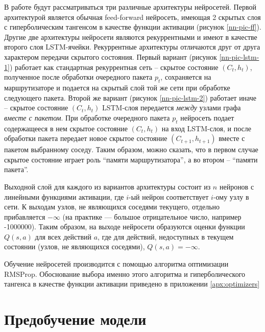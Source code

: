 \documentclass[specification, annotation]{itmo-student-thesis}
\begin{document}
В работе будут рассматриваться три различные архитектуры нейросетей. Первой
архитектурой является обычная feed-forward нейросеть, имеющая 2 скрытых слоя с
гиперболическим тангенсом в качестве функции активации (рисунок
\ref{nn-pic-ff}). Другие две архитектуры нейросети
являются рекуррентными и имеют в качестве второго слоя
LSTM-ячейки\cite{hochreiter1997long}. Рекуррентные
архитектуры отличаются друг от друга характером передачи скрытого состояния.
Первый вариант (рисунок \ref{nn-pic-lstm-1}) работает как стандартная
рекуррентная сеть -- скрытое состояние $(C_t, h_t)$, полученное после обработки
очередного пакета $p_t$, сохраняется на маршрутизаторе и подается на скрытый
слой той же сети при обработке следующего пакета. Второй же вариант (рисунок
\ref{nn-pic-lstm-2}) работает иначе -- скрытое состояние $(C_t, h_t)$ LSTM-слоя
передается \textit{между} узлами графа \textit{вместе с пакетом}. При обработке
очередного пакета $p_t$ нейросеть подает содержащееся в нем скрытое состояние
$(C_t, h_t)$ на вход LSTM-слоя, и после обработки пакета передает новое скрытое
состояние $(C_{t+1}, h_{t+1})$ вместе с пакетом выбранному соседу. Таким
образом, можно сказать, что в первом случае скрытое состояние играет роль
``памяти маршрутизатора'', а во втором -- ``памяти пакета''.

Выходной слой для каждого из вариантов архитектуры состоит из $n$
нейронов с линейными функциями активации, где $i$-ый нейрон
соответствует $i$-ому узлу в сети. К выходам узлов, не являющихся соседями
текущего, отдельно прибавляется $-\infty$ (на практике --- большое отрицательное
число, например -1000000). Таким образом, на выходе нейросети образуются оценки
функции $Q(s, a)$ для всех действий $a$, где для действий, недоступных в текущем
состоянии (узлов, не являющихся соседями), $Q(s, a) = -\infty$.

Обучение нейросетей производится с помощью алгоритма оптимизации
RMSProp\cite{tieleman2012lecture}. Обоснование выбора именно этого алгоритма и
гиперболического тангенса в качестве функции активации приведено в приложении
\ref{apx:optimizers}

\section{Предобучение модели}
\end{document}
